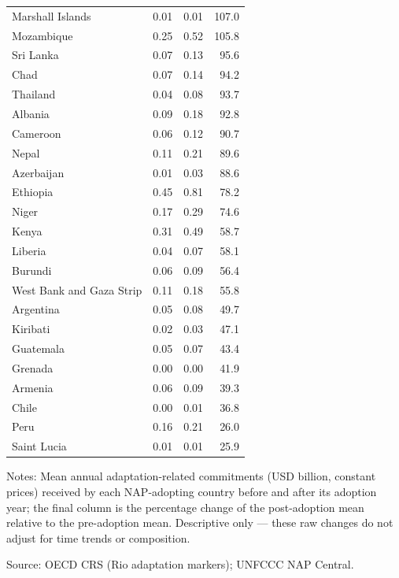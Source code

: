 \begin{table}[H]
{\begin{tabular}{lrrr}
  Marshall Islands & 0.01 & 0.01 & 107.0 \\ 
  Mozambique & 0.25 & 0.52 & 105.8 \\ 
  Sri Lanka & 0.07 & 0.13 & 95.6 \\ 
  Chad & 0.07 & 0.14 & 94.2 \\ 
  Thailand & 0.04 & 0.08 & 93.7 \\ 
  Albania & 0.09 & 0.18 & 92.8 \\ 
  Cameroon & 0.06 & 0.12 & 90.7 \\ 
  Nepal & 0.11 & 0.21 & 89.6 \\ 
  Azerbaijan & 0.01 & 0.03 & 88.6 \\ 
  Ethiopia & 0.45 & 0.81 & 78.2 \\ 
  Niger & 0.17 & 0.29 & 74.6 \\ 
  Kenya & 0.31 & 0.49 & 58.7 \\ 
  Liberia & 0.04 & 0.07 & 58.1 \\ 
  Burundi & 0.06 & 0.09 & 56.4 \\ 
  West Bank and Gaza Strip & 0.11 & 0.18 & 55.8 \\ 
  Argentina & 0.05 & 0.08 & 49.7 \\ 
  Kiribati & 0.02 & 0.03 & 47.1 \\ 
  Guatemala & 0.05 & 0.07 & 43.4 \\ 
  Grenada & 0.00 & 0.00 & 41.9 \\ 
  Armenia & 0.06 & 0.09 & 39.3 \\ 
  Chile & 0.00 & 0.01 & 36.8 \\ 
  Peru & 0.16 & 0.21 & 26.0 \\ 
  Saint Lucia & 0.01 & 0.01 & 25.9 \\ 
   \bottomrule
\end{tabular}
}
\par\vspace{4pt}
\begin{minipage}{\linewidth}\footnotesize
Notes: Mean annual adaptation-related commitments (USD billion, constant prices) received by each NAP-adopting country before and after its adoption year; the final column is the percentage change of the post-adoption mean relative to the pre-adoption mean. Descriptive only --- these raw changes do not adjust for time trends or composition.\par
Source: OECD CRS (Rio adaptation markers); UNFCCC NAP Central.
\end{minipage}
\end{table}
